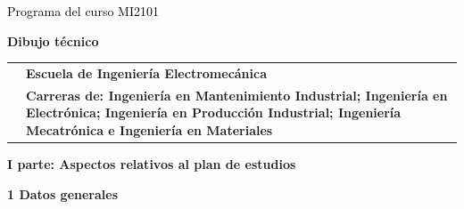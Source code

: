 \documentclass[letterpaper]{article}%
\begin{document}
%
\normalsize%
\thispagestyle{empty}%
%
\vspace*{150mm}%
\par\fontsize{14}{0}\selectfont \textcolor{black}{Programa del curso MI2101}%
\par\fontsize{18}{25}\selectfont \textbf{\textcolor{azulsuaveTEC}{Dibujo técnico}}%
\begin{tabularx}{\textwidth}{m{}m{}}%
&\par\hspace*{0mm}\fontsize{12}{14}\selectfont \textbf{\textcolor{gris}{Escuela de Ingeniería Electromecánica}}\\%
[-4pt]%
&\hspace*{0mm}\fontsize{12}{14}\selectfont \textbf{\textcolor{gris}{Carreras de: Ingeniería en Mantenimiento Industrial; Ingeniería en Electrónica; Ingeniería en Producción Industrial; Ingeniería Mecatrónica e Ingeniería en Materiales}}\\%
\end{tabularx}%
\newpage%
\pagestyle{headfoot}%
\par\fontsize{14}{0}\selectfont \textbf{\textcolor{parte}{I parte: Aspectos relativos al plan de estudios}}%
\par\fontsize{12}{20}\selectfont \textbf{\textcolor{parte}{1 Datos generales}}%
\newline%
\end{document}
